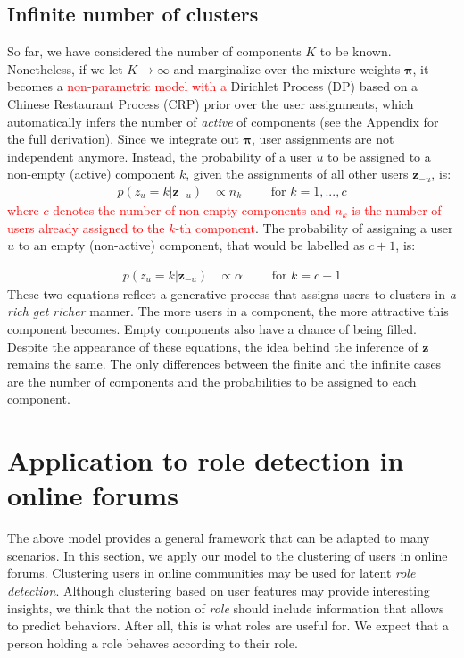 \documentclass[smallextended]{svjour3}          %
\newcommand\alberto[1]{\textcolor{red}{#1}}
\begin{document}
\subsection{Infinite number of clusters}\label{sec:CRP}
So far, we have considered the number of components $K$ to be known. Nonetheless, if we let $K \rightarrow \infty$ and marginalize over the mixture weights $\boldsymbol{\pi}$, it becomes a \alberto{non-parametric model with a} Dirichlet Process (DP) based on a Chinese Restaurant Process (CRP) prior over the user assignments, which automatically infers the number of \textit{active} of components (see the Appendix for the full derivation). Since we integrate out $\boldsymbol{\pi}$, user assignments are not independent anymore.
Instead, the probability of a user $u$ to be assigned to a non-empty (active) component $k$, given the assignments of all other users $\mathbf{z}_{-u}$, is:
\begin{align}
	p(z_u = k | \mathbf{z}_{-u}) &\propto n_k \qquad \text{ for } k = 1,...,c
\end{align}
%
\alberto{where $c$ denotes the number of non-empty components and $n_k$ is the number of users already assigned to the $k$-th component}. The probability of assigning a user $u$ to an empty (non-active) component, that would be labelled as $c+1$, is: 

\begin{align}
	p(z_u = k | \mathbf{z}_{-u}) &\propto \alpha \qquad  \text{ for } k=c+1
\end{align}
%
These two equations reflect a generative process that assigns users to clusters in \textit{a rich get richer} manner. The more users in a component, the more attractive this component becomes. Empty components also have a chance of being filled. 
Despite the appearance of these equations, the idea behind the inference of $\mathbf{z}$ remains the same. The only differences between the finite and the infinite cases are the number of components and the probabilities to be assigned to each component.



\section{Application to role detection in online forums}\label{sec:forums}

The above model provides a general framework that can be adapted to many scenarios. In this section, we apply our model to the clustering of users in online forums. Clustering users in online communities may be used for latent \textit{role detection}. Although clustering based on user features may provide interesting insights, we think that the notion of \textit{role} should include information that allows to predict behaviors. After all, this is what roles are useful for. We expect that a person holding a role behaves according to their role.
\end{document}
